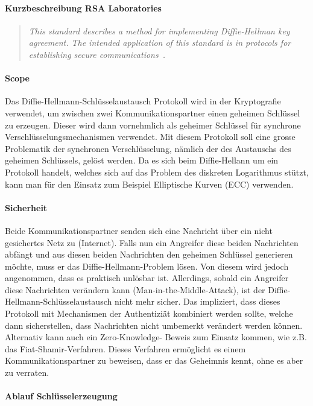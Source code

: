 \documentclass[10pt,a4paper]{article}
\begin{document}
\paragraph{Kurzbeschreibung RSA Laboratories}

\begin{quotation}
    \itshape This standard describes a method for implementing Diffie-Hellman key
    agreement. The intended application of this standard is in protocols for establishing
    secure communications~\cite{pkcs10}.
\end{quotation}


\paragraph{Scope}
Das Diffie-Hellmann-Schlüsselaustausch Protokoll wird in der Kryptografie verwendet, um
zwischen zwei Kommunikationspartner einen geheimen Schlüssel zu erzeugen. Dieser wird dann
vornehmlich als geheimer Schlüssel für synchrone Verschlüsselungsmechanismen verwendet.
Mit diesem Protokoll soll eine grosse Problematik der synchronen Verschlüsselung, nämlich
der des Austauschs des geheimen Schlüssels, gelöst werden. Da es sich beim Diffie-Hellann
um ein Protokoll handelt, welches sich auf das Problem des diskreten Logarithmus stützt,
kann man für den Einsatz zum Beispiel Elliptische Kurven (ECC) verwenden.

\paragraph{Sicherheit}
Beide Kommunikationspartner senden sich eine Nachricht über ein nicht gesichertes Netz zu
(Internet). Falls nun ein Angreifer diese beiden Nachrichten abfängt und aus diesen beiden
Nachrichten den geheimen Schlüssel generieren möchte, muss er das Diffie-Hellmann-Problem
lösen. Von diesem wird jedoch angenommen, dass es praktisch unlösbar ist. Allerdings,
sobald ein Angreifer diese Nachrichten verändern kann (Man-in-the-Middle-Attack), ist der
Diffie- Hellmann-Schlüsselaustausch nicht mehr sicher.  Das impliziert, dass dieses
Protokoll mit Mechanismen der Authentiziät kombiniert werden sollte, welche dann
sicherstellen, dass Nachrichten nicht umbemerkt verändert werden können. Alternativ kann
auch ein Zero-Knowledge- Beweis zum Einsatz kommen, wie z.B. das Fiat-Shamir-Verfahren.
Dieses Verfahren ermöglicht es einem Kommunikationspartner zu beweisen, dass er das
Geheimnis kennt, ohne es aber zu verraten.

\paragraph{Ablauf Schlüsselerzeugung}
\end{document}
